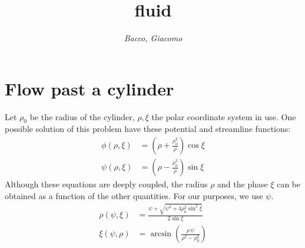 \documentclass[b5paper,11pt,oneside,fleqn]{article}
\title{\raggedleft\sffamily\Huge fluid}
\author{\sffamily\itshape Bacco, Giacomo}
\date{}
\begin{document}
\maketitle

\section{Flow past a cylinder}

Let $ \rho_0 $ be the radius of the cylinder, $ \rho,\xi $ the polar coordinate 
system in use.
One possible solution of this problem have these potential and streamline 
functions:
\begin{align}
\phi(\rho,\xi) &= \left( \rho + \frac{\rho_0^2}{\rho} \right) \cos\xi \\[1ex]
\psi(\rho,\xi) &= \left( \rho - \frac{\rho_0^2}{\rho} \right) \sin\xi 
\end{align}
Although these equations are deeply coupled, the radius $ \rho $ and the phase 
$ \xi $ can be obtained as a function of the other quantities.
For our purposes, we use $ \psi $.
\begin{align}
\rho(\psi,\xi) &= \frac{\psi + \sqrt{\psi^2 + 4\rho_0^2 \sin^2\xi}}{2\sin\xi} 
\\[1ex]
\xi(\psi,\rho) &= \arcsin \left( \frac{\rho\, \psi}{\rho^2 - \rho_0^2} \right)  
\end{align}
\end{document}
